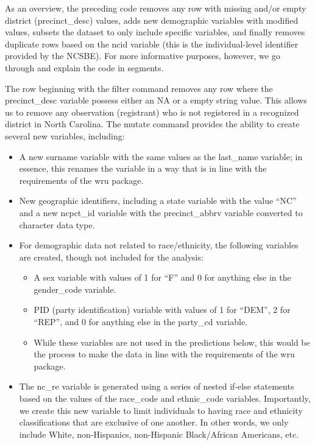 \documentclass[
]{article}
\providecommand{\tightlist}{%
  \setlength{\itemsep}{0pt}\setlength{\parskip}{0pt}}
\begin{document}
As an overview, the preceding code removes any row with missing and/or
empty district (precinct\_desc) values, adds new demographic variables
with modified values, subsets the dataset to only include specific
variables, and finally removes duplicate rows based on the ncid variable
(this is the individual-level identifier provided by the NCSBE). For
more informative purposes, however, we go through and explain the code
in segments.

The row beginning with the filter command removes any row where the
precinct\_desc variable possess either an NA or a empty string value.
This allows us to remove any observation (registrant) who is not
registered in a recognized district in North Carolina. The mutate
command provides the ability to create several new variables, including:

\begin{itemize}
\tightlist
\item
  A new surname variable with the same values as the last\_name
  variable; in essence, this renames the variable in a way that is in
  line with the requirements of the wru package.
\item
  New geographic identifiers, including a state variable with the value
  ``NC'' and a new ncpct\_id variable with the precinct\_abbrv variable
  converted to character data type.
\item
  For demographic data not related to race/ethnicity, the following
  variables are created, though not included for the analysis:

  \begin{itemize}
  \tightlist
  \item
    A sex variable with values of 1 for ``F'' and 0 for anything else in
    the gender\_code variable.
  \item
    PID (party identification) variable with values of 1 for ``DEM'', 2
    for ``REP'', and 0 for anything else in the party\_cd variable.
  \item
    While these variables are not used in the predictions below, this
    would be the process to make the data in line with the requirements
    of the wru package.
  \end{itemize}
\item
  The nc\_re variable is generated using a series of nested if-else
  statements based on the values of the race\_code and ethnic\_code
  variables. Importantly, we create this new variable to limit
  individuals to having race and ethnicity classifications that are
  exclusive of one another. In other words, we only include White,
  non-Hispanics, non-Hispanic Black/African Americans, etc.
\end{itemize}
\end{document}
